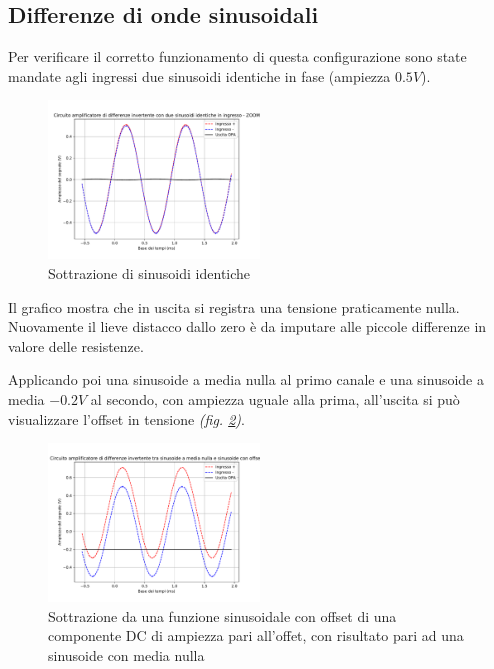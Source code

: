 \documentclass[journal]{IEEEtran}
\begin{document}
\subsection{Differenze di onde sinusoidali}
Per verificare il corretto funzionamento di questa configurazione sono state mandate agli ingressi due sinusoidi identiche in fase (ampiezza $0.5 V$). 

\begin{figure}[H]%
\begin {center}
\includegraphics[width=0.50\textwidth]{analysis/output/OPA_diff_sin2.pdf}
\caption{Sottrazione di sinusoidi identiche}
\label{fig:diff2}
\end {center}
\end{figure}

Il grafico mostra che in uscita si registra una tensione praticamente nulla. Nuovamente il lieve distacco dallo zero è da imputare alle piccole differenze in valore delle resistenze.

Applicando poi una sinusoide a media nulla al primo canale e una sinusoide a media $-0.2 V$ al secondo, con ampiezza uguale alla prima, all'uscita si può visualizzare l'offset in tensione \textit{(fig. \ref{fig:diff3})}. 

\begin{figure}[H]%
\begin {center}
\includegraphics[width=0.50\textwidth]{analysis/output/OPA_diff_sin3.pdf}
\caption{Sottrazione da una funzione sinusoidale con offset di una componente DC di ampiezza pari all'offet, con risultato pari ad una sinusoide con media nulla}
\label{fig:diff3}
\end {center}
\end{figure}
\end{document}
